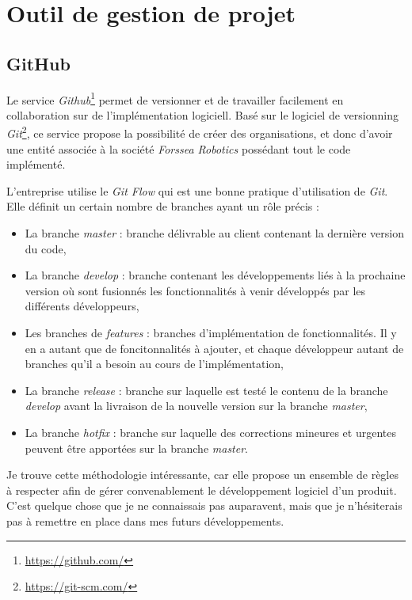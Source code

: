 	\section{Outil de gestion de projet}

		\subsection{GitHub}

			Le service \textit{Github}\footnote{\url{https://github.com/}} permet de versionner et de travailler facilement en collaboration sur de l'implémentation logiciell. Basé sur le logiciel de versionning \textit{Git}\footnote{\url{https://git-scm.com/}}, ce service propose la possibilité de créer des organisations, et donc d'avoir une entité associée à la société \textit{Forssea Robotics} possédant tout le code implémenté.

			L'entreprise utilise le \textit{Git Flow} qui est une bonne pratique d'utilisation de \textit{Git}. Elle définit un certain nombre de branches ayant un rôle précis :

			\begin{itemize}
				\item La branche \textit{master} : branche délivrable au client contenant la dernière version du code,
				\item La branche \textit{develop} : branche contenant les développements liés à la prochaine version où sont fusionnés les fonctionnalités à venir développés par les différents développeurs,
				\item Les branches de \textit{features} : branches d'implémentation de fonctionnalités. Il y en a autant que de foncitonnalités à ajouter, et chaque développeur autant de branches qu'il a besoin au cours de l'implémentation,
				\item La branche \textit{release} : branche sur laquelle est testé le contenu de la branche \textit{develop} avant la livraison de la nouvelle version sur la branche \textit{master},
				\item La branche \textit{hotfix} : branche sur laquelle des corrections mineures et urgentes peuvent être apportées sur la branche \textit{master}.
			\end{itemize}

			Je trouve cette méthodologie intéressante, car elle propose un ensemble de règles à respecter afin de gérer convenablement le développement logiciel d'un produit. C'est quelque chose que je ne connaissais pas auparavent, mais que je n'hésiterais pas à remettre en place dans mes futurs développements.

